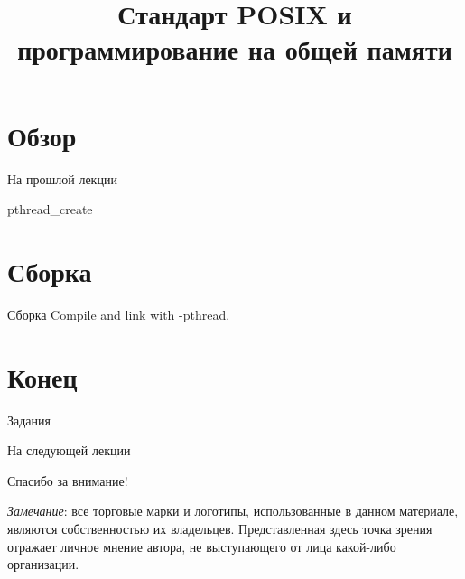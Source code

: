 

\title{Стандарт POSIX и программирование на общей памяти}



\begin{frame}
\titlepage
\end{frame}

\section{Обзор}

\begin{frame}
\tableofcontents
\end{frame} 

\begin{frame}{На прошлой лекции}
\end{frame}


\begin{frame}{pthread_create}

\create

\end{frame}

\section{Сборка}

\begin{frame}{Сборка}
Compile and link with -pthread.
\end{frame}

\section{Конец}

\begin{frame}{Задания}
\end{frame}

\begin{frame}{На следующей лекции}
\end{frame}

\begin{frame}

{\huge{Спасибо за внимание!}\par}

\vfill

\tiny{\textit{Замечание}: все торговые марки и логотипы, использованные в данном материале, являются собственностью их владельцев. Представленная здесь точка зрения отражает личное мнение автора, не выступающего от лица какой-либо организации.}

\end{frame}

